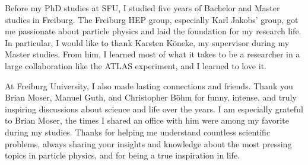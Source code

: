 Before my PhD studies at SFU, I studied five years of Bachelor and Master studies in Freiburg. 
The Freiburg HEP group, especially Karl Jakobs' group, got me passionate about particle physics and laid the foundation for my research life.
In particular, I would like to thank Karsten Köneke, my supervisor during my Master studies.
From him, I learned most of what it takes to be a researcher in a large collaboration like the ATLAS experiment, and I learned to love it.   

At Freiburg University, I also made lasting connections and friends. Thank you Brian Moser, Manuel Guth, and Christopher Böhm for funny, intense, and truly inspiring discussions about science and life over the years.
I am especially grateful to Brian Moser, the times I shared an office with him were among my favorite during my studies. Thanks for helping me understand countless scientific problems, always sharing your insights and knowledge about the most pressing topics in particle physics, and for being a true inspiration in life.






